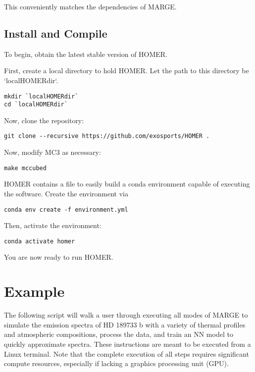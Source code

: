 \documentclass[letterpaper, 12pt]{article}
\begin{document}
This conveniently matches the dependencies of MARGE.



\subsection{Install and Compile}
\label{sec:install}

\noindent To begin, obtain the latest stable version of HOMER.  

\noindent First, create a local directory to hold HOMER.  Let the path to this directory 
be `localHOMERdir`.

\begin{verbatim}
mkdir `localHOMERdir`
cd `localHOMERdir`
\end{verbatim}

\noindent Now, clone the repository:
\begin{verbatim}
git clone --recursive https://github.com/exosports/HOMER .
\end{verbatim}

\noindent Now, modify MC3 as necessary:

\begin{verbatim}
make mccubed
\end{verbatim}

\noindent HOMER contains a file to easily build a conda environment capable of 
executing the software.  Create the environment via

\begin{verbatim}
conda env create -f environment.yml
\end{verbatim}

\noindent Then, activate the environment:

\begin{verbatim}
conda activate homer
\end{verbatim}

\noindent You are now ready to run HOMER.


\section{Example}
\label{sec:example}

\noindent The following script will walk a user through executing all modes of MARGE 
to simulate the emission spectra of HD 189733 b with a variety of thermal 
profiles and atmospheric compositions, process the data, and train an NN 
model to quickly approximate spectra.  These instructions are meant to be 
executed from a Linux terminal.  Note that the complete execution of all steps 
requires significant compute resources, especially if lacking a graphics 
processing unit (GPU).
\end{document}
